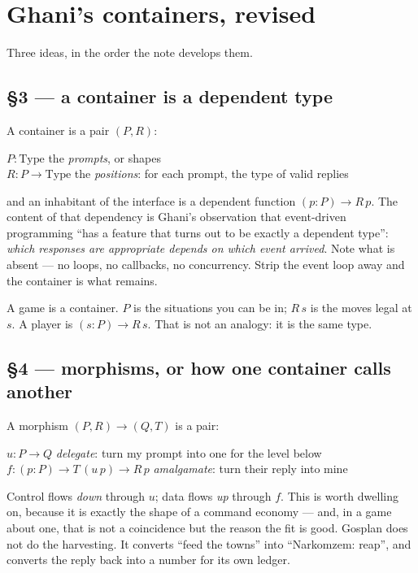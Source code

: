 \documentclass[11pt,a4paper]{article}
\begin{document}
\section{Ghani's containers, revised}

Three ideas, in the order the note develops them.

\subsection{\S3 --- a container is a dependent type}

A container is a pair $(P, R)$:

\begin{center}
$P : \mathrm{Type}$ \qquad the \emph{prompts}, or shapes\\[1mm]
$R : P \to \mathrm{Type}$ \qquad the \emph{positions}: for each prompt, the type of valid replies
\end{center}

\noindent and an inhabitant of the interface is a dependent function
$(p : P) \to R\,p$. The content of that dependency is Ghani's observation that
event-driven programming ``has a feature that turns out to be exactly a
dependent type'': \emph{which responses are appropriate depends on which event
arrived}. Note what is absent --- no loops, no callbacks, no concurrency. Strip
the event loop away and the container is what remains.

A game is a container. $P$ is the situations you can be in; $R\,s$ is the moves
legal at $s$. A player is $(s : P) \to R\,s$. That is not an analogy: it is the
same type.

\subsection{\S4 --- morphisms, or how one container calls another}

A morphism $(P,R) \to (Q,T)$ is a pair:

\begin{center}
$u : P \to Q$ \qquad \emph{delegate}: turn my prompt into one for the level below\\[1mm]
$f : (p : P) \to T\,(u\,p) \to R\,p$ \qquad \emph{amalgamate}: turn their reply into mine
\end{center}

\noindent Control flows \emph{down} through $u$; data flows \emph{up} through
$f$. This is worth dwelling on, because it is exactly the shape of a command
economy --- and, in a game about one, that is not a coincidence but the reason
the fit is good. Gosplan does not do the harvesting. It converts ``feed the
towns'' into ``Narkomzem: reap'', and converts the reply back into a number for
its own ledger.
\end{document}
